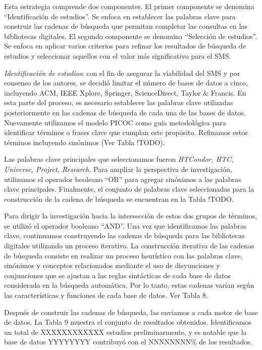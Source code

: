 Esta estrategia comprende dos componentes. El primer componente se denomina ``Identificación de estudios''. Se enfoca en establecer las palabras clave para construir las cadenas de búsqueda que permitan completar las consultas en las bibliotecas digitales. El segundo componente se denomina ``Selección de estudios''. Se enfoca en aplicar varios criterios para refinar los resultados de búsqueda de estudios y seleccionar aquellos con el valor más significativo para el SMS.\@

\textit{Identificación de estudios}: con el fin de asegurar la viabilidad del SMS y por consenso de los autores, se decidió limitar el número de bases de datos a cinco, incluyendo ACM, IEEE Xplore, Springer, ScienceDirect, Taylor \& Francis. En esta parte del proceso, es necesario establecer las palabras clave utilizadas posteriormente en las cadenas de búsqueda de cada una de las bases de datos. Nuevamente utilizamos el modelo PICOC como guía metodológica para identificar términos o frases clave que cumplan este propósito. Refinamos estos términos incluyendo sinónimos (Ver Tabla !TODO).

Las palabras clave principales que seleccionamos fueron \textit{HTCondor, HTC, Universe, Project, Research}. Para ampliar la perspectiva de investigación, utilizamos el operador booleano ``OR'' para agregar sinónimos a las palabras clave principales.
Finalmente, el conjunto de palabras clave seleccionadas para la construcción de la cadena de búsqueda se encuentran en la Tabla !TODO.

Para dirigir la investigación hacia la intersección de estos dos grupos de términos, se utilizó el operador booleano ``AND''. Una vez que identificamos las palabras clave, continuamos construyendo las cadenas de búsqueda para las bibliotecas digitales utilizando un proceso iterativo. La construcción iterativa de las cadenas de búsqueda consiste en realizar un proceso heurístico con las palabras clave, sinónimos y conceptos relacionados mediante el uso de disyunciones y conjunciones que se ajustan a las reglas sintácticas de cada base de datos considerada en la búsqueda automática. Por lo tanto, estas cadenas varían según las características y funciones de cada base de datos. Ver Tabla 8.

Después de construir las cadenas de búsqueda, las enviamos a cada motor de base de datos. La Tabla 9 muestra el conjunto de resultados obtenidos. Identificamos un total de XXXXXXXXXXXX estudios preliminarmente, y es notable que la base de datos  YYYYYYYY contribuyó con el NNNNNNNN\% de los resultados.




